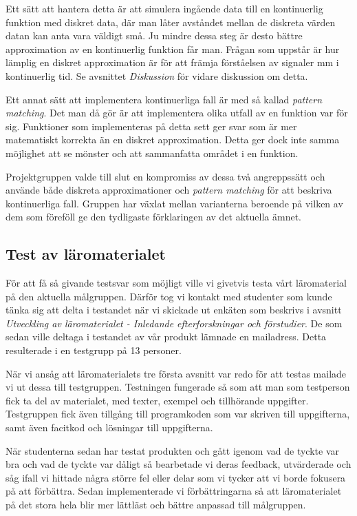 \documentclass[]{article}
\begin{document}
Ett sätt att hantera detta är att simulera ingående data till en  kontinuerlig funktion med diskret data, där 
man låter avståndet mellan de diskreta värden datan kan anta vara väldigt små. Ju mindre dessa steg är desto bättre 
approximation av en kontinuerlig funktion får man. Frågan som uppstår är hur lämplig en diskret approximation är för 
att främja förståelsen av signaler mm i kontinuerlig tid. Se avsnittet \textit{Diskussion} för vidare diskussion om detta.

Ett annat sätt att implementera kontinuerliga fall är med så kallad \textit{pattern matching}. Det man då gör är att 
implementera olika utfall av en funktion var för sig. Funktioner som implementeras på detta sett ger svar som är mer 
matematiskt korrekta än en diskret approximation. Detta ger dock inte samma möjlighet att se mönster och att sammanfatta 
området i en funktion.

Projektgruppen valde till slut en kompromiss av dessa två angreppssätt och använde både diskreta approximationer och 
\textit{pattern matching} för att beskriva kontinuerliga fall. Gruppen har växlat mellan varianterna beroende på vilken 
av dem som föreföll ge den tydligaste förklaringen av det aktuella ämnet.

\subsection{Test av läromaterialet}

För att få så givande testsvar som möjligt ville vi givetvis testa vårt läromaterial på den aktuella målgruppen.  Därför 
tog vi kontakt med studenter som kunde tänka sig att delta i testandet när vi skickade ut enkäten som beskrivs i avsnitt 
\textit{Utveckling av läromaterialet - Inledande efterforskningar och förstudier}. De som sedan ville deltaga i 
testandet av vår produkt lämnade en mailadress. Detta resulterade i en testgrupp på 13 personer. 
 
När vi ansåg att läromaterialets tre första avsnitt var redo för att testas mailade vi ut dessa till testgruppen. 
Testningen fungerade så som att man som testperson fick ta del av materialet, med texter, exempel och tillhörande 
uppgifter. Testgruppen fick även tillgång till programkoden som var skriven till uppgifterna, samt även facitkod och 
lösningar till uppgifterna.

När studenterna sedan har testat produkten och gått igenom vad de tyckte var bra och vad de tyckte var dåligt så 
bearbetade vi deras feedback, utvärderade och såg ifall vi hittade några större fel eller delar som vi tycker att vi 
borde fokusera på att förbättra. Sedan implementerade vi förbättringarna så att läromaterialet på det stora hela blir 
mer lättläst och bättre anpassad till målgruppen.
\end{document}
